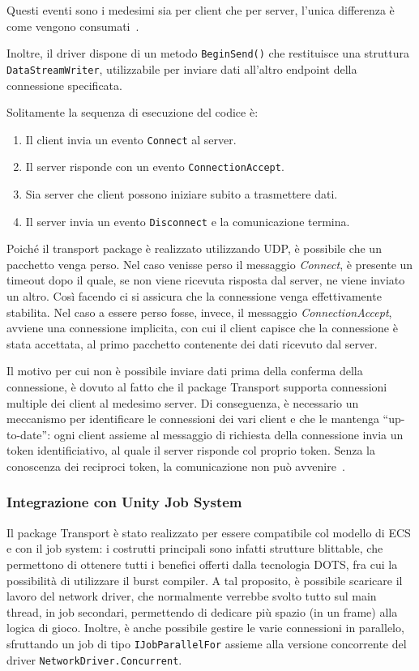 Questi eventi sono i medesimi sia per client che per server, l'unica differenza è come vengono consumati~\cite{doc:unity-transport-manual}.

Inoltre, il driver dispone di un metodo \verb|BeginSend()| che restituisce una struttura \verb|DataStreamWriter|, utilizzabile per inviare dati all'altro endpoint della connessione specificata.

Solitamente la sequenza di esecuzione del codice è:
\begin{enumerate}
    \item Il client invia un evento \verb|Connect| al server.
    \item Il server risponde con un evento \verb|ConnectionAccept|.
    \item Sia server che client possono iniziare subito a trasmettere dati.
    \item Il server invia un evento \verb|Disconnect| e la comunicazione termina.
\end{enumerate}

Poiché il transport package è realizzato utilizzando UDP, è possibile che un pacchetto venga perso. Nel caso venisse perso il messaggio \emph{Connect}, è presente un timeout dopo il quale, se non viene ricevuta risposta dal server, ne viene inviato un altro. Così facendo ci si assicura che la connessione venga effettivamente stabilita. Nel caso a essere perso fosse, invece, il messaggio \emph{ConnectionAccept}, avviene una connessione implicita, con cui il client capisce che la connessione è stata accettata, al primo pacchetto contenente dei dati ricevuto dal server.

Il motivo per cui non è possibile inviare dati prima della conferma della connessione, è dovuto al fatto che il package Transport supporta connessioni multiple dei client al medesimo server. Di conseguenza, è necessario un meccanismo per identificare le connessioni dei vari client e che le mantenga ``up-to-date'': ogni client assieme al messaggio di richiesta della connessione invia un token identificiativo, al quale il server risponde col proprio token. Senza la conoscenza dei reciproci token, la comunicazione non può avvenire~\cite{youtube:unity-transport}.

\subsubsection{Integrazione con Unity Job System}
Il package Transport è stato realizzato per essere compatibile col modello di ECS e con il job system: i costrutti principali sono infatti strutture blittable, che permettono di ottenere tutti i benefici offerti dalla tecnologia DOTS, fra cui la possibilità di utilizzare il burst compiler.
A tal proposito, è possibile scaricare il lavoro del network driver, che normalmente verrebbe svolto tutto sul main thread, in job secondari, permettendo di dedicare più spazio (in un frame) alla logica di gioco. Inoltre, è anche possibile gestire le varie connessioni in parallelo, sfruttando un job di tipo \verb|IJobParallelFor| assieme alla versione concorrente del driver \verb|NetworkDriver.Concurrent|.

